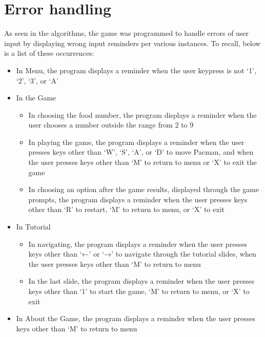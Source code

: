 
\section{Error handling}

As seen in the algorithms, the game was programmed to handle errors of user
input by displaying wrong input reminders per various instances. To recall,
below is a list of these occurrences:\\
    \begin{itemize}[label={}]
        \item In Menu, the program displays a reminder when the user keypress is not `1', `2', `3', or `A'
        \item In the Game
            \begin{itemize}[label={}]
                \item In choosing the food number, the program displays a
                    reminder when the user chooses a number outside the range
                    from 2 to 9 \item In playing the game, the program displays
                    a reminder when the user presses keys other than `W', `S',
                    `A', or `D' to move Pacman, and when the user presses keys
                    other than `M' to return to menu or `X' to exit the game
                \item In choosing an option after the game results, displayed
                    through the game prompts, the program displays a reminder
                    when the user presses keys other than `R' to restart, `M'
                    to return to menu, or `X' to exit
            \end{itemize}
        \item In Tutorial
            \begin{itemize}[label={}]
                \item In navigating, the program displays a reminder when the
                    user presses keys other than `←' or `→' to navigate through
                    the tutorial slides, when the user presses keys other than
                    `M' to return to menu \item In the last slide, the program
                    displays a reminder when the user presses keys other than
                    `1' to start the game, `M' to return to menu, or `X' to
                    exit
            \end{itemize}
        \item In About the Game, the program displays a reminder when the user presses keys other than `M' to return to menu
    \end{itemize}
